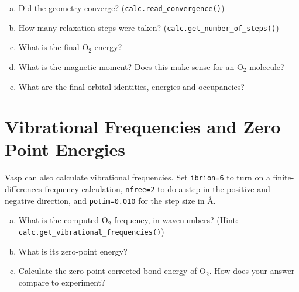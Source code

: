 \documentclass[11pt]{article}
\begin{document}
\begin{enumerate}[(a)]
\item Did the geometry converge? (\verb~calc.read_convergence()~)

\item How many relaxation steps were taken? (\verb~calc.get_number_of_steps()~)

\item What is the final O$_{\text{2}}$ energy?

\item What is the magnetic moment? Does this make sense for an O$_{\text{2}}$ molecule?

\item What are the final orbital identities, energies and occupancies?
\end{enumerate}

\section{Vibrational Frequencies and Zero Point Energies}
\label{sec-5}

Vasp can also calculate vibrational frequencies. Set \verb~ibrion=6~ to turn on a finite-differences frequency calculation, \verb~nfree=2~ to do a step in the positive and negative direction, and \verb~potim=0.010~ for the step size in \AA{}.

\begin{enumerate}[(a)]
\item What is the computed O$_{\text{2}}$ frequency, in wavenumbers? (Hint: \verb~calc.get_vibrational_frequencies()~)

\item What is its zero-point energy?

\item Calculate the zero-point corrected bond energy of O$_{\text{2}}$. How does your answer compare to experiment?
\end{enumerate}
\end{document}
